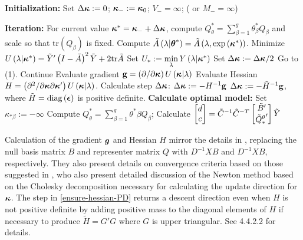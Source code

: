 \documentclass[../chapter-2-spline-representation.tex]{subfiles}
\begin{document}
\begin{algorithm}[H]
\caption{ }
\begin{algorithmic}
\STATE \textbf{Initialization:} 
	\STATE Set $\Delta \mbox{\boldmath $\kappa$} := 0$; \;$\mbox{\boldmath $\kappa$}_{-}:=\mbox{\boldmath $\kappa$}_{0}$; \;$V_- = \infty$; \;( or $M_- = \infty$)

\STATE \textbf{Iteration:} 
		\STATE For current value $\mbox{\boldmath $\kappa$}^* = \mbox{\boldmath $\kappa$}_- + \Delta \mbox{\boldmath $\kappa$}$, compute $Q^*_\theta = \sum_{\beta = 1}^g \theta^*_\beta Q_\beta$ and scale so that $\mbox{tr}\left(Q_\beta\right)$ is fixed. 
		\STATE Compute $\tilde{A}\left(\lambda \vert \mbox{\boldmath $\theta$}^* \right) = \tilde{A}\left(\lambda, \exp\left({\mbox{\boldmath $\kappa$}^*} \right)\right)$.
		\STATE Minimize $U\left(\lambda \vert \mbox{\boldmath $\kappa$}^* \right) =  \tilde{Y}'\left( I - \tilde{A} \right)^2\tilde{Y} + 2\mbox{tr}\tilde{A} $
		\STATE Set $U_* := \min \limits_\lambda Y\left( \lambda \vert \mbox{\boldmath $\kappa$}^* \right) $
		 		\STATE Set $\Delta \mbox{\boldmath $\kappa$} := \Delta \mbox{\boldmath $\kappa$}/2$
		 		\STATE Go to (1).
		\ELSE
		\STATE Continue
		\ENDIF
		\STATE Evaluate gradient $\mathbf{g} = \left(\partial /\partial \mbox{\boldmath $\kappa$}\right) U\left(\mbox{\boldmath $\kappa$} \vert \lambda\right)$
		\STATE Evaluate Hessian $H = \left(\partial^2 /\partial \mbox{\boldmath $\kappa$}\partial \mbox{\boldmath $\kappa$}' \right) U\left(\mbox{\boldmath $\kappa$} \vert \lambda\right)$.
		\STATE Calculate step $\Delta \mbox{\boldmath $\kappa$}$:
				\STATE $\Delta \mbox{\boldmath $\kappa$} := -H^{-1} \mathbf{g}$
			\ELSE
				\STATE $\Delta \mbox{\boldmath $\kappa$} := -\tilde{H}^{-1} \mathbf{g}$, where $\tilde{H} = \textup{diag}\left(\mbox{\boldmath $\epsilon$}\right)$ is positive definite. \label{ensure-hessian-PD}
			\ENDIF
	\ENDWHILE
\STATE \textbf{Calculate optimal model:} 
		\STATE Set $\kappa_{*\beta} := -\infty$
	\ENDIF
	\STATE Compute $Q^*_\theta = \sum_{\beta = 1}^g \theta^*{\beta} Q_\beta$;
	\STATE Calculate $\begin{bmatrix} d \\ c \end{bmatrix} = \tilde{C}^{-1} \tilde{C}^{-T} \begin{bmatrix} \tilde{B}' \\ {\tilde{Q}_*^\theta}' \end{bmatrix} \tilde{Y}$
\end{algorithmic}
\end{algorithm}

Calculation of the gradient $\mbox{\boldmath $g$}$ and Hessian $H$ mirror the details in \citet{gu1991minimizing}, replacing the null basis matrix $B$ and representer matrix $Q$ with $D^{-1}XB$ and $D^{-1}XB$, respectively. They also present details on convergence criteria based on those suggested in \citet{gill1981practical}, who also present detailed discussion of the Newton method based on the Cholesky decomposition necessary for calculating the update direction for $\mbox{\boldmath $\kappa$}$. The step in \ref{ensure-hessian-PD} returns a descent direction even when $H$ is not positive definite by adding positive mass to the diagonal elements of $H$ if necessary to produce $\tilde{H} = G'G$ where $G$ is upper triangular. See \citet{gill1981practical} 4.4.2.2 for details. 
\bigskip
\end{document}
